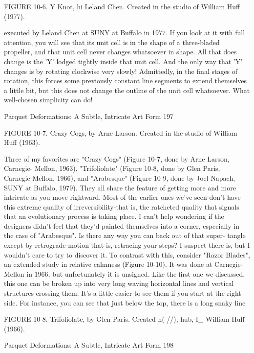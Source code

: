           FIGURE 10-6. Y Knot, hi Leland Chen. Created in the studio of William Huff
(1977).

executed by Leland Chen at SUNY at Buffalo in 1977. If you look at it with full
attention, you will see that its unit cell is in the shape of a three-bladed propeller, and that
unit cell never changes whatsoever in shape. All that does change is the 'Y' lodged tightly
inside that unit cell. And the only way that 'Y' changes is by rotating clockwise very
slowly! Admittedly, in the final stages of rotation, this forces some previously constant
line segments to extend themselves a little bit, but this does not change the outline of the
unit cell whatsoever. What well-chosen simplicity can do!




Parquet Deformations: A Subtle, Intricate Art Form                                         197

          FIGURE 10-7. Crazy Cogs, by Arne Larson. Created in the studio of William Huff
(1963).


Three of my favorites are "Crazy Cogs" (Figure 10-7, done by Arne Larson, Carnegie-
Mellon, 1963), "Trifoliolate" (Figure 10-8, done by Glen Paris, Carnegie-Mellon, 1966),
and "Arabesque" (Figure 10-9, done by Joel Napach, SUNY at Buffalo, 1979). They all
share the feature of getting more and more intricate as you move rightward. Most of the
earlier ones we've seen don't have this extreme quality of irreversibility-that is, the
ratcheted quality that signals that an evolutionary process is taking place. I can't help
wondering if the designers didn't feel that they'd painted themselves into a corner,
especially in the case of "Arabesque". Is there any way you can back out of that super-
tangle except by retrograde motion-that is, retracing your steps? I suspect there is, but I
wouldn't care to try to discover it.
        To contrast with this, consider "Razor Blades", an extended study in relative
calmness (Figure 10-10). It was done at Carnegie-Mellon in 1966, but unfortunately it is
unsigned. Like the first one we discussed, this one can be broken up into very long
waving horizontal lines and vertical structures crossing them. It's a little easier to see
them if you start at the right side. For instance, you can see that just below the top, there
is a long snaky line

FIGURE 10-8. Trifoliolate, by Glen Paris. Created n( //), hub,-I\_ William Huff (1966).




Parquet Deformations: A Subtle, Intricate Art Form                                       198

